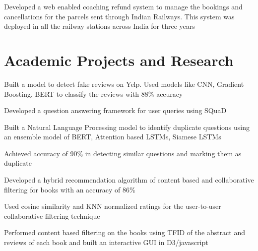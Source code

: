 \documentclass[]{resume-openfont}
\begin{document}
\begin{minipage}[t]{0.66\textwidth}
\begin{tightemize}
\item Developed a web enabled coaching refund system to manage the bookings and cancellations for the parcels sent
through Indian Railways. This system was deployed in all the railway stations across India for three years
\end{tightemize}


\section{Academic Projects and Research}

\descript{}\location{}
\begin{tightemize}
\item Built a model to detect fake reviews on Yelp. Used models like CNN, Gradient Boosting, BERT to classify the reviews with 88\% accuracy
\item Developed a question answering framework for user queries using SQuaD
\end{tightemize}
\sectionsep

\descript{}\location{}
\begin{tightemize}
\item Built a Natural Language Processing model to identify duplicate questions using an ensemble model of BERT, Attention based LSTMs, Siamese LSTMs
\item Achieved accuracy of 90\% in detecting similar questions and marking them as duplicate
\end{tightemize}
\sectionsep

\descript{}\location{}
\begin{tightemize}
\item Developed a hybrid recommendation algorithm of content based and collaborative filtering for books with an accuracy of 86\%
\item Used cosine similarity and KNN normalized ratings for the  user-to-user collaborative filtering technique
\item Performed content based filtering on the books using TFID of the abstract and reviews of each book and built an interactive GUI in D3/javascript
\end{tightemize}
\sectionsep



\end{minipage}
\end{document}
